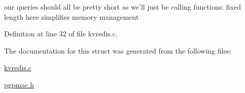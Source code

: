 our queries should all be pretty short as we'll just be calling functions\-: fixed length here simplifies memory management 



Definition at line 32 of file kvredis.\-c.



The documentation for this struct was generated from the following files\-:\begin{DoxyCompactItemize}
\item 
\hyperlink{kvredis_8c}{kvredis.\-c}\item 
\hyperlink{pgpmac_8h}{pgpmac.\-h}\end{DoxyCompactItemize}
